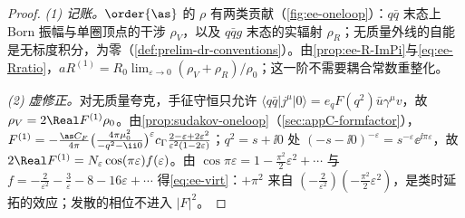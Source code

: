 \begin{proof}
\emph{(1) 记账。}$\order{\as}$ 的 $\rho$ 有两类贡献（\cref{fig:ee-oneloop}）：$q\bar q$ 末态上 Born 振幅与单圈顶点的干涉 $\rho_V$，以及 $q\bar qg$ 末态的实辐射 $\rho_R$；无质量外线的自能是无标度积分，为零（\cref{def:prelim-dr-conventions}）。由\cref{prop:ee-R-ImPi}与\cref{eq:ee-Rratio}，$aR^{(1)}=R_0\lim_{\varepsilon\to0}(\rho_V+\rho_R)/\rho_0$；这一阶不需要耦合常数重整化。

\emph{(2) 虚修正。}对无质量夸克，手征守恒只允许 $\langle q\bar q|j^\mu|0\rangle=e_qF(q^2)\bar u\gamma^\mu v$，故 $\rho_V=2\Real F^{(1)}\rho_0$。由\cref{prop:sudakov-oneloop}（\cref{sec:appC-formfactor}），$F^{(1)}=-\frac{\as C_F}{4\pi}\big(\frac{4\pi\mu_0^2}{-q^2-\ii0}\big)^{\varepsilon}c_\Gamma\frac{2-\varepsilon+2\varepsilon^2}{\varepsilon^2(1-2\varepsilon)}$；$q^2=s+\ii0$ 处 $(-s-\ii0)^{-\varepsilon}=s^{-\varepsilon}\ee^{\ii\pi\varepsilon}$，故 $2\Real F^{(1)}=N_\varepsilon\cos(\pi\varepsilon)f(\varepsilon)$。由 $\cos\pi\varepsilon=1-\frac{\pi^2}2\varepsilon^2+\cdots$ 与 $f=-\frac2{\varepsilon^2}-\frac3\varepsilon-8-16\varepsilon+\cdots$ 得\cref{eq:ee-virt}：$+\pi^2$ 来自 $(-\frac2{\varepsilon^2})(-\frac{\pi^2}2\varepsilon^2)$，是类时延拓的效应；发散的相位不进入 $|F|^2$。


\end{proof}

